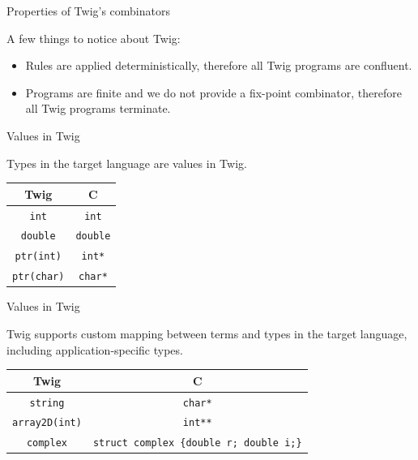 \documentclass{beamer}
\begin{document}
\begin{frame}{Properties of Twig's combinators}

A few things to notice about Twig:

\begin{itemize}

\item Rules are applied deterministically, therefore all Twig programs are
confluent.

\item Programs are finite and we do not provide a fix-point combinator,
therefore all Twig programs terminate.

\end{itemize}

\end{frame}


\begin{frame}{Values in Twig}

Types in the target language are values in Twig.

\begin{center}
\begin{tabular}{c | c}
  Twig               & C \\
  \hline                       
  \texttt{int}       & \texttt{int}    \\
  \texttt{double}    & \texttt{double} \\
  \texttt{ptr(int)}  & \texttt{int*}   \\
  \texttt{ptr(char)} & \texttt{char*}  \\
\end{tabular}
\end{center}

\end{frame}


\begin{frame}{Values in Twig}

Twig supports custom mapping between terms and types in the target language,
including application-specific types.

\begin{center}
\begin{tabular}{c | c}
  Twig                  & C \\
  \hline                       
  \texttt{string}       & \texttt{char*} \\
  \texttt{array2D(int)} & \texttt{int**} \\
  \texttt{complex}      & \texttt{struct complex \{double r; double i;\}} \\
\end{tabular}
\end{center}

\end{frame}
\end{document}
